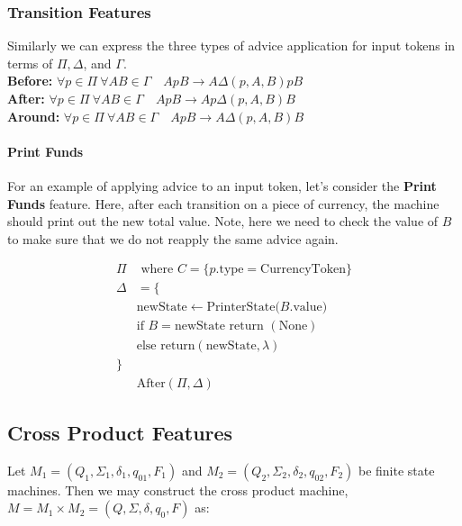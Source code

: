 \documentclass[sigplan,anonymous,review]{acmart}
\begin{document}
\subsubsection{Transition Features}
Similarly we can express the three types of advice application for input tokens in terms of $\Pi, \Delta$, and $\Gamma$.\\
\textbf{Before:} $\forall p \in \Pi \ \forall AB \in \Gamma \quad A p B \rightarrow A \Delta(p, A, B)pB$\\
\textbf{After:} $\forall p \in \Pi \ \forall AB \in \Gamma \quad A p B \rightarrow A p \Delta(p, A, B)B$\\
\textbf{Around:} $\forall p \in \Pi \ \forall AB \in \Gamma \quad A p B \rightarrow A  \Delta(p, A, B)B$

\paragraph{Print Funds} For an example of applying advice to an input token, let's consider the \textbf{Print Funds} feature. Here, after each transition on a piece of currency, the machine should print out the new total value. Note, here we need to check the value of $B$ to make sure that we do not reapply the same advice again.

\begin{align*}
    \Pi & \text{ where } C = \{p.\mathrm{type} = \mathrm{CurrencyToken}\}\\
    \Delta &= \{\\
    &\mathrm{newState} \leftarrow \mathrm{PrinterState(} B.\mathrm{value})\\
    &\text{if } B = \mathrm{newState} \text{ return } (\mathrm{None})\\
    &\text{else return} (\mathrm{newState}, \lambda)\\
    \}\\
    &\mathrm{After}(\Pi, \Delta)
\end{align*}

\subsection{Cross Product Features}

Let $M_1 = (Q_1, \Sigma_1, \delta_1, q_{01}, F_1)$ and $M_2 = (Q_2, \Sigma_2, \delta_2, q_{02}, F_2)$ be finite state machines. Then we may construct the cross product machine, $M = M_1 \times M_2 = (Q, \Sigma, \delta, q_0, F)$ as: 
\end{document}
